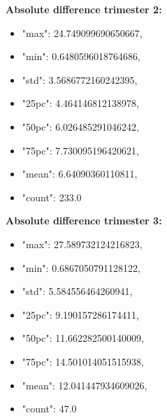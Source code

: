 	\textbf{Absolute difference trimester 2:}
	\begin{itemize}
		\item "max": 24.749099690650667,
		\item "min": 0.6480596018764686,
		\item "std": 3.5686772160242395,
		\item "25pc": 4.464146812138978,
		\item "50pc": 6.026485291046242,
		\item "75pc": 7.730095196420621,
		\item "mean": 6.64090360110811,
		\item "count": 233.0
	\end{itemize}

	\textbf{Absolute difference trimester 3:}
	\begin{itemize}
		\item "max": 27.589732124216823,
		\item "min": 0.6867050791128122,
		\item "std": 5.584556464260941,
		\item "25pc": 9.190157286174411,
		\item "50pc": 11.662282500140009,
		\item "75pc": 14.501014051515938,
		\item "mean": 12.041447934609026,
		\item "count": 47.0
	\end{itemize}
	
	